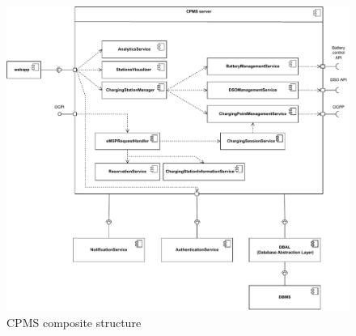 \begin{figure}[H]
    \centering
    \includegraphics[width=1\textwidth]{Images/cp2/CPMS_server.pdf}
    \caption{CPMS composite structure}
\end{figure}

